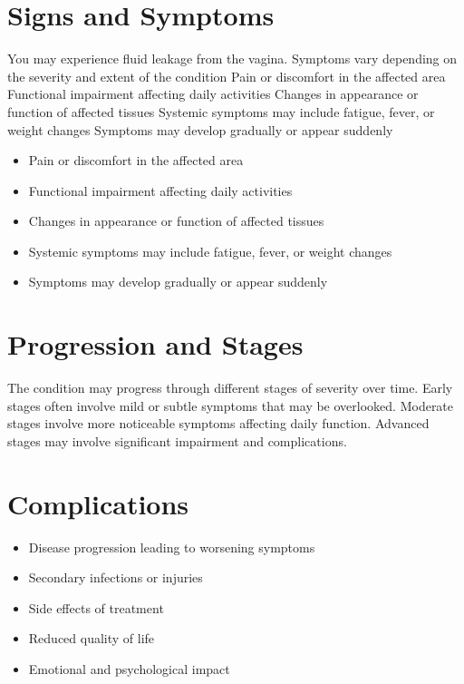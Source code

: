 \section{Signs and Symptoms}
You may experience fluid leakage from the vagina. Symptoms vary depending on the severity and extent of the condition Pain or discomfort in the affected area Functional impairment affecting daily activities Changes in appearance or function of affected tissues Systemic symptoms may include fatigue, fever, or weight changes Symptoms may develop gradually or appear suddenly

\begin{itemize}[noitemsep]
  \item Pain or discomfort in the affected area
  \item Functional impairment affecting daily activities
  \item Changes in appearance or function of affected tissues
  \item Systemic symptoms may include fatigue, fever, or weight changes
  \item Symptoms may develop gradually or appear suddenly
\end{itemize}
\section{Progression and Stages}
The condition may progress through different stages of severity over time. Early stages often involve mild or subtle symptoms that may be overlooked. Moderate stages involve more noticeable symptoms affecting daily function. Advanced stages may involve significant impairment and complications.
\section{Complications}
\begin{itemize}[noitemsep]
  \item Disease progression leading to worsening symptoms
  \item Secondary infections or injuries
  \item Side effects of treatment
  \item Reduced quality of life
  \item Emotional and psychological impact
\end{itemize}
